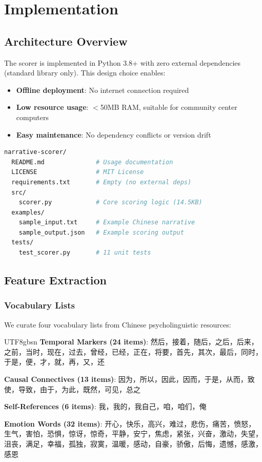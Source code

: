 \documentclass[11pt]{article}
\begin{document}

\section{Implementation}\label{sec:implementation}

\subsection{Architecture Overview}

The scorer is implemented in Python 3.8+ with zero external dependencies (standard library only). This design choice enables:
\begin{itemize}
    \item \textbf{Offline deployment}: No internet connection required
    \item \textbf{Low resource usage}: $<$50MB RAM, suitable for community center computers
    \item \textbf{Easy maintenance}: No dependency conflicts or version drift
\end{itemize}

\begin{lstlisting}[language=bash, caption={Narrative Scorer Repository Structure}]
narrative-scorer/
  README.md              # Usage documentation
  LICENSE                # MIT License
  requirements.txt       # Empty (no external deps)
  src/
    scorer.py            # Core scoring logic (14.5KB)
  examples/
    sample_input.txt     # Example Chinese narrative
    sample_output.json   # Example scoring output
  tests/
    test_scorer.py       # 11 unit tests
\end{lstlisting}

\subsection{Feature Extraction}

\subsubsection{Vocabulary Lists}

We curate four vocabulary lists from Chinese psycholinguistic resources:

\begin{CJK}{UTF8}{gbsn}
\textbf{Temporal Markers (24 items)}: 然后，接着，随后，之后，后来，之前，当时，现在，过去，曾经，已经，正在，将要，首先，其次，最后，同时，于是，便，才，就，再，又，还

\textbf{Causal Connectives (13 items)}: 因为，所以，因此，因而，于是，从而，致使，导致，由于，为此，既然，可见，总之

\textbf{Self-References (6 items)}: 我，我的，我自己，咱，咱们，俺

\textbf{Emotion Words (32 items)}: 开心，快乐，高兴，难过，悲伤，痛苦，愤怒，生气，害怕，恐惧，惊讶，惊奇，平静，安宁，焦虑，紧张，兴奋，激动，失望，沮丧，满足，幸福，孤独，寂寞，温暖，感动，自豪，骄傲，后悔，遗憾，感激，感恩
\end{CJK}
\end{document}
